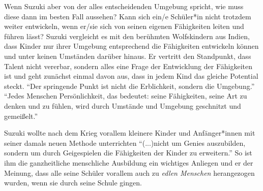 Wenn Suzuki aber von der alles entscheidenden Umgebung spricht, wie muss diese
dann im besten Fall aussehen? Kann sich ein/e Schüler*in nicht trotzdem weiter
entwickeln, wenn er/sie sich von seinen eigenen Fähigkeiten leiten und führen
lässt? Suzuki vergleicht es mit den berühmten Wolfskindern aus Indien, dass
Kinder nur ihrer Umgebung entsprechend die Fähigkeiten entwickeln können und
unter keinen Umständen darüber hinaus. \autocite[24]{suzuki:erziehung_ist_liebe}
Er vertritt den Standpunkt, dass Talent nicht vererbar, sondern alles eine Frage
der Entwicklung der Fähigkeiten ist und geht zunächst einmal davon aus, dass in
jedem Kind das gleiche Potential steckt. \enquote{Der springende Punkt ist nicht
die Erblichkeit, sondern die Umgebung.}
\autocite[24]{suzuki:erziehung_ist_liebe} \enquote{Jedes Menschen
Persönlichkeit, das bedeutet: seine Fähigkeiten, seine Art zu denken und zu
fühlen, wird durch Umstände und Umgebung geschnitzt und gemeißelt.}
\autocite[20]{suzuki:erziehung_ist_liebe}

Suzuki wollte nach dem Krieg vorallem kleinere Kinder und Anfänger*innen mit
seiner damals neuen Methode unterrichten \enquote{(...)nicht um Genies
auszubilden, sondern um durch Geigespielen die Fähigkeiten der Kinder zu
erweitern.} \autocite[43]{suzuki:erziehung_ist_liebe} So ist ihm die
ganzheitliche menschliche Ausbildung ein wichtiges Anliegen und er der Meinung,
dass alle seine Schüler vorallem auch zu \emph{edlen Menschen} herangezogen
wurden, wenn sie durch seine Schule gingen. 










